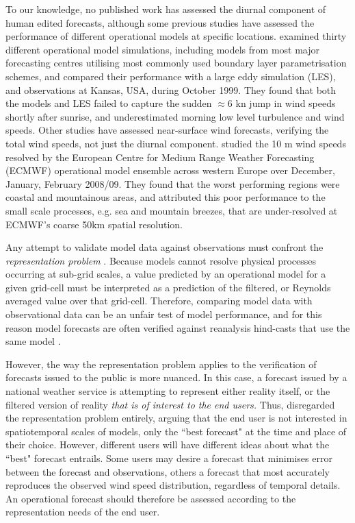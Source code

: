 \documentclass{ametsoc}
\begin{document}
To our knowledge, no published work has assessed the diurnal component of human edited forecasts, although some previous studies have assessed the performance of different operational models at specific locations. \citet{svensson11} examined thirty different operational model simulations, including models from most major forecasting centres utilising most commonly used boundary layer parametrisation schemes, and compared their performance with a large eddy simulation (LES), and observations at Kansas, USA, during October 1999. They found that both the models and LES failed to capture the sudden $\approx 6$ kn jump in wind speeds shortly after sunrise, and underestimated morning low level turbulence and wind speeds. Other studies have assessed near-surface wind forecasts, verifying the total wind speeds, not just the diurnal component. \citet{pinson12} studied the 10 m wind speeds resolved by the European Centre for Medium Range Weather Forecasting (ECMWF) operational model ensemble across western Europe over December, January, February 2008/09. They found that the worst performing regions were coastal and mountainous areas, and attributed this poor performance to the small scale processes, e.g. sea and mountain breezes, that are under-resolved at ECMWF's coarse 50km spatial resolution. 

Any attempt to validate model data against observations must confront the \textit{representation problem} \citep[e.g.][]{zaron06}. Because models cannot resolve physical processes occurring at sub-grid scales, a value predicted by an operational model for a given grid-cell must be interpreted as a prediction of the filtered, or Reynolds averaged value over that grid-cell. Therefore, comparing model data with observational data can be an unfair test of model performance, and for this reason model forecasts are often verified against reanalysis hind-casts that use the same model \citep[e.g.][]{lynch14}.

However, the way the representation problem applies to the verification of forecasts issued to the public is more nuanced. In this case, a forecast issued by a national weather service is attempting to represent either reality itself, or the filtered version of reality \textit{that is of interest to the end users.} Thus, \citet{pinson12} disregarded the representation problem entirely, arguing that the end user is not interested in spatiotemporal scales of models, only the ``best forecast" at the time and place of their choice. However, different users will have different ideas about what the ``best" forecast entrails. Some users may desire a forecast that minimises error between the forecast and observations, others a forecast that most accurately reproduces the observed wind speed distribution, regardless of temporal details. An operational forecast should therefore be assessed according to the representation needs of the end user. 
\end{document}
